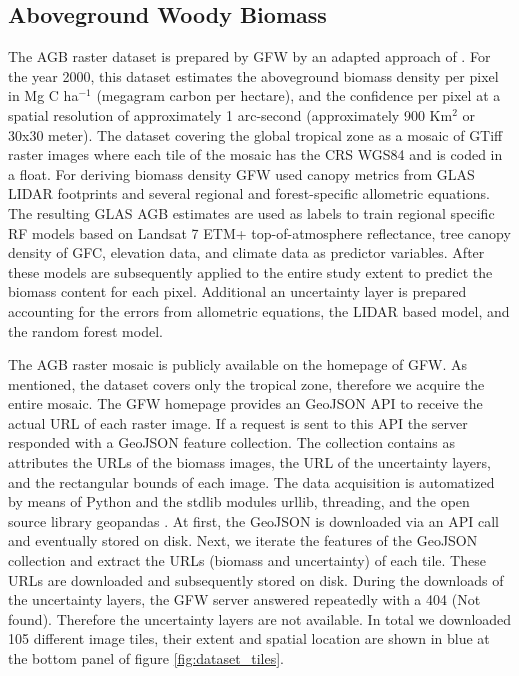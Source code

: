 	\subsection{Aboveground Woody Biomass}
		The \ac{AGB} raster dataset is prepared by \ac{GFW} by an adapted approach of \citeauthor{Baccini2012} \citep{Baccini2012,Baccini2015,Baccini2017}. For the year 2000, this dataset estimates the aboveground biomass density per pixel in Mg C ha$^{-1}$ (megagram carbon per hectare), and the confidence per pixel at a spatial resolution of approximately 1 arc-second (approximately 900 Km$^2$ or 30x30 meter). The dataset covering the global tropical zone as a mosaic of \ac{GTiff} raster images where each tile of the mosaic has the \ac{CRS} \ac{WGS84} and is coded in a float. For deriving biomass density \ac{GFW} used canopy metrics from \ac{GLAS} \ac{LIDAR} footprints and several regional and forest-specific allometric equations. The resulting \ac{GLAS} \ac{AGB} estimates are used as labels to train regional specific \ac{RF} models based on Landsat 7 \ac{ETM+} top-of-atmosphere reflectance, tree canopy density of \ac{GFC}, elevation data, and climate data as predictor variables. After these models are subsequently applied to the entire study extent to predict the biomass content for each pixel. Additional an uncertainty layer is prepared accounting for the errors from allometric equations, the \ac{LIDAR} based model, and the random forest model.

		The \ac{AGB} raster mosaic is publicly available on the homepage of \ac{GFW}. As mentioned, the dataset covers only the tropical zone, therefore we acquire the entire mosaic. The \ac{GFW} homepage provides an \ac{GeoJSON} \ac{API} to receive the actual \ac{URL} of each raster image. If a request is sent to this \ac{API} the server responded with a \ac{GeoJSON} feature collection. The collection contains as attributes the \ac{URL}s of the biomass images, the \ac{URL} of the uncertainty layers, and the rectangular bounds of each image. The data acquisition is automatized by means of Python and the \ac{stdlib} modules urllib, threading, and the open source library geopandas \citep{Rossum2018,McKinney2010}. At first, the \ac{GeoJSON} is downloaded via an \ac{API} call and eventually stored on disk. Next, we iterate the features of the \ac{GeoJSON} collection and extract the \ac{URL}s (biomass and uncertainty) of each tile. These \ac{URL}s are downloaded and subsequently stored on disk. During the downloads of the uncertainty layers, the \ac{GFW} server answered repeatedly with a 404 (Not found). Therefore the uncertainty layers are not available. In total we downloaded 105 different image tiles, their extent and spatial location are shown in blue at the bottom panel of figure \ref{fig:dataset_tiles}.

